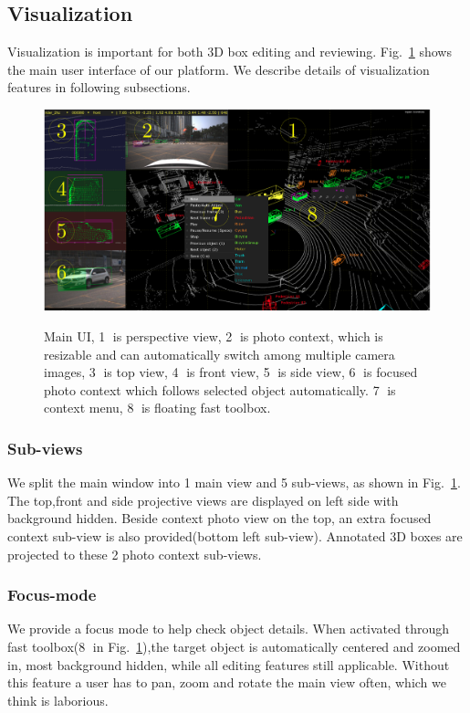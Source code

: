 \documentclass[letterpaper, 10 pt, conference]{ieeeconf}  %
\begin{document}
\subsection{Visualization}

Visualization is important for both 3D box editing and reviewing. Fig.~\ref{fig:main-ui} shows the main user interface of our platform. We describe details of visualization features in following subsections.

\begin{figure}[!t]
	\centering	
	\includegraphics[width=\linewidth]{./figures/main-ui}\\
	\caption{Main UI, \textcircled{1} is perspective view, \textcircled{2} is photo context, which is resizable and can automatically switch among multiple camera images, \textcircled{3} is top view, \textcircled{4} is front view, \textcircled{5} is side view, \textcircled{6} is focused photo context which follows selected object automatically. \textcircled{7} is context menu, \textcircled{8} is floating fast toolbox.}
	\label{fig:main-ui}
\end{figure}

\subsubsection{Sub-views}
\label{section:sub-views}
We split the main window into 1 main view and 5 sub-views, as shown in Fig.~\ref{fig:main-ui}. The top,front and side projective views are displayed on left side with background hidden. Beside context photo view on the top, an extra focused context sub-view is also provided(bottom left sub-view). Annotated 3D boxes are projected to these 2 photo context sub-views.




\subsubsection{Focus-mode}
We provide a focus mode to help check object details. When activated through fast toolbox(\textcircled{8} in Fig.~\ref{fig:main-ui}),the target object is automatically centered and zoomed in, most background hidden, while all editing features still applicable. Without this feature a user has to pan,  zoom and rotate the main view often, which we think is laborious.
\end{document}
